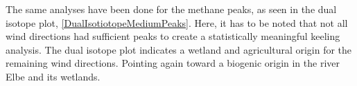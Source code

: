The same analyses have been done for the methane peaks, as seen in the dual isotope plot, \cref{DualIsotiotopeMediumPeaks}. Here, it has to be noted that not all wind directions had sufficient peaks to create a statistically meaningful keeling analysis. The dual isotope plot indicates a wetland and agricultural origin for the remaining wind directions. Pointing again toward a biogenic origin in the river Elbe and its wetlands.


